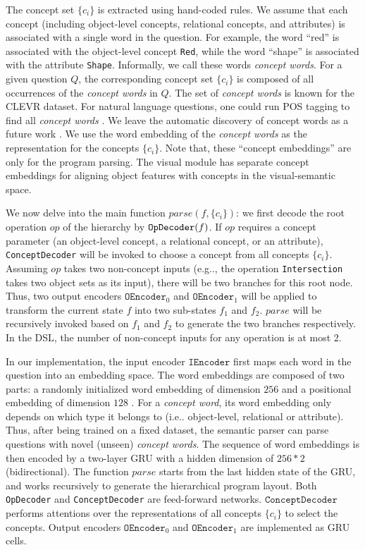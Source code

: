 \documentclass{article} \usepackage{iclr2019_conference,times}
\makeatletter
\DeclareRobustCommand\onedot{\futurelet\@let@token\@onedot}
\def\@onedot{\ifx\@let@token.\else.\null\fi\xspace}
\def\eg{e.g\onedot} \def\Eg{E.g\onedot}
\def\ie{i.e\onedot} \def\Ie{I.e\onedot}
\makeatother
\begin{document}
The concept set $\{c_i\}$ is extracted using hand-coded rules. We assume that each concept (including object-level concepts, relational concepts, and attributes) is associated with a single word in the question. For example, the word ``red'' is associated with the object-level concept {\tt Red}, while the word ``shape'' is associated with the attribute {\tt Shape}. Informally, we call these words {\it concept words}. For a given question $Q$, the corresponding concept set $\{c_i\}$ is composed of all occurrences of the {\it concept words} in $Q$.
The set of {\it concept words} is known for the CLEVR dataset. For natural language questions, one could run POS tagging to find all {\it concept words} \citep{Andreas2016Learning,Schuster2015Generating}. We leave the automatic discovery of concept words as a future work \citep{gauthier2018word}. We use the word embedding of the {\it concept words} as the representation for the concepts $\{c_i\}$. Note that, these ``concept embeddings'' are only for the program parsing. The visual module has separate concept embeddings for aligning object features with concepts in the visual-semantic space.

We now delve into the main function $parse(f, \{c_i\})$: we first decode the root operation $op$ of the hierarchy by ${\tt OpDecoder}(f)$. If $op$ requires a concept parameter (an object-level concept, a relational concept, or an attribute), {\tt ConceptDecoder} will be invoked to choose a concept from all concepts $\{c_i\}$. Assuming $op$ takes two non-concept inputs  (\eg, the operation {\tt Intersection} takes two object sets as its input), there will be two branches for this root node. Thus, two output encoders $\texttt{OEncoder}_0$ and $\texttt{OEncoder}_1$ will be applied to transform the current state $f$ into two sub-states $f_1$ and $f_2$. $parse$ will be recursively invoked based on $f_1$ and $f_2$ to generate the two branches respectively. In the DSL, the number of non-concept inputs for any operation is at most 2.

In our implementation, the input encoder $\texttt{IEncoder}$ first maps each word in the question into an embedding space. The word embeddings are composed of two parts: a randomly initialized word embedding of dimension $256$ and a positional embedding of dimension $128$ \citep{Gehring2017Convolutional}. For a {\it concept word}, its word embedding only depends on which type it belongs to (\ie object-level, relational or attribute). Thus, after being trained on a fixed dataset, the semantic parser can parse questions with novel (unseen) {\it concept words}. The sequence of word embeddings is then encoded by a two-layer GRU with a hidden dimension of $256 * 2$ (bidirectional). The function $parse$ starts from the last hidden state of the GRU, and works recursively to generate the hierarchical program layout. Both {\tt OpDecoder} and {\tt ConceptDecoder} are feed-forward networks. $\texttt{ConceptDecoder}$ performs attentions over the representations of all concepts $\{c_i\}$ to select the concepts. Output encoders $\texttt{OEncoder}_0$ and $\texttt{OEncoder}_1$ are implemented as GRU cells. 
\end{document}
